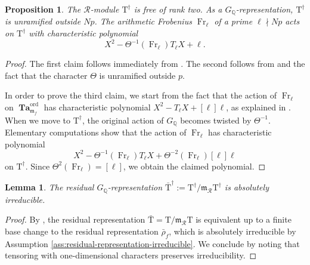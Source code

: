 \documentclass[12pt,reqno]{amsart}
\newtheorem{lemma}[theorem]{Lemma}
\newtheorem{proposition}[theorem]{Proposition}
\theoremstyle{definition}
\theoremstyle{remark}
\newcommand{\numberset}{\mathbb}
\newcommand{\Q}{\numberset{Q}}
\DeclareMathOperator{\Ta}{Ta}
\newcommand{\Taa}{\boldsymbol{\Ta}}
\newcommand{\T}{\boldsymbol{\mathrm{T}}}
\DeclareMathOperator{\ord}{ord}
\DeclareMathOperator{\Fr}{Fr}
\newcommand{\m}{\mathfrak{m}}
\begin{document}
    \begin{proposition}\label{prop:characteristic-polynomial-Frobenius}
		The $\mathcal{R}$-module $\T^{\dag}$ is free of rank two. As a $G_\Q$-representation, $\T^{\dag}$ is unramified outside $Np$. The arithmetic Frobenius $\Fr_\ell$ of a prime $\ell\nmid Np$ acts on $\T^{\dag}$ with characteristic polynomial
		\begin{equation*}
		X^2-\Theta^{-1}(\Fr_\ell)T_\ell X+\ell.
		\end{equation*}
	\end{proposition}
	\begin{proof}
        The first claim follows immediately from \cite[Proposition 2.1.2]{Howard07:variation-of-Heegner-points-in-Hida-families}. The second follows from \cite[Proposition 2.1.2]{Howard07:variation-of-Heegner-points-in-Hida-families} and the fact that the character $\Theta$ is unramified outside $p$.
		
		In order to prove the third claim, we start from the fact that the action of $\Fr_\ell$ on $\Taa^{\ord}_{\m_f}$ has characteristic polynomial $X^2-T_\ell X+[\ell]\ell$, as explained in \cite[Proposition 2.1.2]{Howard07:variation-of-Heegner-points-in-Hida-families}. When we move to $\T^\dag$, the original action of $G_\Q$ becomes twisted by $\Theta^{-1}$. Elementary computations show that the action of $\Fr_\ell$ has characteristic polynomial
		\begin{equation*}
		X^2-\Theta^{-1}(\Fr_\ell)T_\ell X+\Theta^{-2}(\Fr_\ell)[\ell]\ell
		\end{equation*}
	on $\T^\dag$. Since $\Theta^2(\Fr_\ell)=[\ell]$, we obtain the claimed polynomial.
	\end{proof}

        \begin{lemma}\label{lem:twist-Hida-representation-irreducible}
            The residual $G_\Q$-representation $\bar{\T}^\dag:=\T^\dag/\m_{\mathcal{R}}\T^\dag$ is absolutely irreducible.
        \end{lemma}
        \begin{proof}
            By \cite[Proposition 5.4]{Longo-Vigni11:quaternion-algebras-Hida-families}, the residual representation $\bar{\T}=\T/\m_{\mathcal{R}}\T$ is equivalent up to a finite base change to the residual representation $\bar{\rho}_f$, which is absolutely irreducible by Assumption \ref{ass:residual-representation-irreducible}. We conclude by noting that tensoring with one-dimensional characters preserves irreducibility.
        \end{proof}
\end{document}
